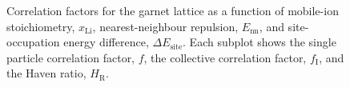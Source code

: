 \documentclass[aps,prb,twocolumn,superscriptaddress,reprint]{revtex4-1}
\newcommand{\xLi}{x_\m{Li}}
\newcommand{\m}[1]{\mathrm{#1}}
\begin{document}
\begin{figure}[tb]
  \centering
    \caption{\label{fig:correlation_miniplots}Correlation factors for the garnet lattice as a function of mobile-ion stoichiometry, $\xLi$, nearest-neighbour repulsion, $E_\m{nn}$, and site-occupation energy difference, $\Delta E_\m{site}$. Each subplot shows the single particle correlation factor, $f$, the collective correlation factor, $f_\m{I}$, and the Haven ratio, $H_\m{R}$.}
\end{figure}
\end{document}
